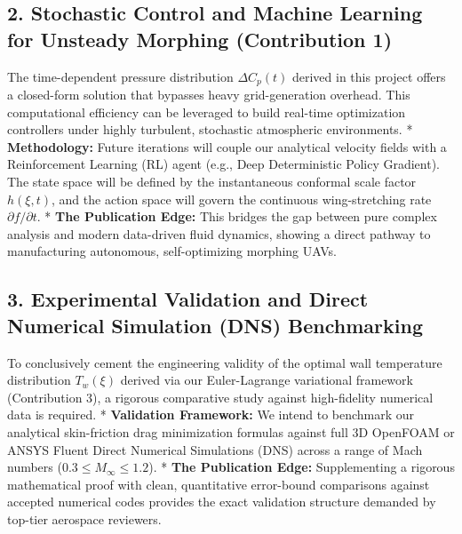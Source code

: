 \documentclass[12pt,a4paper]{article}
\begin{document}
\subsection{2. Stochastic Control and Machine Learning for Unsteady Morphing (Contribution 1)}
The time-dependent pressure distribution $\Delta C_p(t)$ derived in this project offers a closed-form solution that bypasses heavy grid-generation overhead. This computational efficiency can be leveraged to build real-time optimization controllers under highly turbulent, stochastic atmospheric environments.
* \textbf{Methodology:} Future iterations will couple our analytical velocity fields with a Reinforcement Learning (RL) agent (e.g., Deep Deterministic Policy Gradient). The state space will be defined by the instantaneous conformal scale factor $h(\xi, t)$, and the action space will govern the continuous wing-stretching rate $\partial f/\partial t$.
* \textbf{The Publication Edge:} This bridges the gap between pure complex analysis and modern data-driven fluid dynamics, showing a direct pathway to manufacturing autonomous, self-optimizing morphing UAVs.

\subsection{3. Experimental Validation and Direct Numerical Simulation (DNS) Benchmarking}
To conclusively cement the engineering validity of the optimal wall temperature distribution $T_w(\xi)$ derived via our Euler-Lagrange variational framework (Contribution 3), a rigorous comparative study against high-fidelity numerical data is required.
* \textbf{Validation Framework:} We intend to benchmark our analytical skin-friction drag minimization formulas against full 3D OpenFOAM or ANSYS Fluent Direct Numerical Simulations (DNS) across a range of Mach numbers ($0.3 \le M_\infty \le 1.2$).
* \textbf{The Publication Edge:} Supplementing a rigorous mathematical proof with clean, quantitative error-bound comparisons against accepted numerical codes provides the exact validation structure demanded by top-tier aerospace reviewers.
\end{document}
